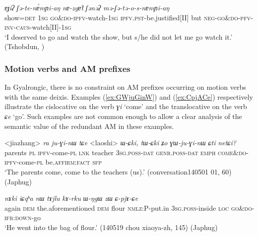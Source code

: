 \documentclass[oneside,a4paper,11pt]{article}
\newcommand{\ipa}[1]{{\phon\textit{#1}}}
\newcommand{\japhug}[2]{\textit{\phon#1} `#2'}
\newcommand{\sens}[1]{‘#1’}
\newcommand{\rouge}[1]{{\color{red}#1}}
\begin{document}
\begin{exe}
\ex \label{ex:mESEtosnAmYiaN}
\gll \ipa{tʃone=nəʔ}	\ipa{ɐɟiʔ}	\ipa{ʃə-te-nɐ́mɲi-aŋ}	\ipa{nɐ-zgɐ̂t}	\ipa{ʃənəʔ}	\ipa{mə-\rouge{ʃə}-tə-o-s-nɐmɲi-aŋ} \\
 show=\textsc{det} \textsc{1sg} \textsc{go\&do}-\textsc{ipfv}-watch-\textsc{1sg} \textsc{ipfv}.\textsc{pst}-be.justified[II] but \textsc{neg}-\rouge{\textsc{go\&do}}-\textsc{pfv}-\textsc{inv}-\textsc{caus}-watch[II]-\textsc{1sg} \\
\glt  \sens{I deserved to go and watch the show, but s/he did not let me go watch it.} (Tshobdun, \citealt[478]{sun12complementation})
  \end{exe} 
 

\subsubsection{Motion verbs and AM prefixes}
In Gyalrongic, there is no constraint on AM prefixes occurring on motion verbs with the same deixis. Examples (\ref{ex:GWjuGinW}) and (\ref{ex:CpjACe}) respectively illustrate the cislocative on the verb \japhug{ɣi}{come} and the translocative on the verb \japhug{ɕe}{go}. Such examples are not common enough to allow a clear analysis of the semantic value of the redundant AM in these examples.

\begin{exe}
\ex \label{ex:GWjuGinW}
 \gll <jiazhang> \ipa{ra}	\ipa{ju-ɣi-nɯ}	\ipa{tɕe}  <laoshi> \ipa{ɯ-ɕki,}	\ipa{tɯ-ɕki}	\ipa{ʑo}	\ipa{\rouge{ɣɯ}-ju-ɣi-nɯ}	\ipa{ɕti}	\ipa{netɕi?}  \\
 parents \textsc{pl} \textsc{ipfv}-come-\textsc{pl} \textsc{lnk} teacher \textsc{3sg}.\textsc{poss}-\textsc{dat} \textsc{genr}.\textsc{poss}-\textsc{dat} \textsc{emph} \rouge{\textsc{come\&do}}-\textsc{ipfv}-come-\textsc{pl} be.\textsc{affirm}:\textsc{fact} \textsc{sfp} \\
 \glt `The parents come, come to the teachers (us).' (conversation140501 01, 60) (Japhug)
\end{exe}

\begin{exe}
\ex \label{ex:CpjACe}
 \gll \ipa{li}	\ipa{nɤki}	\ipa{iɕqʰa}	\ipa{nɯ}	\ipa{tɤjlu}	\ipa{kɤ-rku}	\ipa{ɯ-ŋgɯ}	\ipa{zɯ}	\ipa{\rouge{ɕ}-pjɤ-ɕe} \\
 again \textsc{dem} the.aforementioned \textsc{dem} flour \textsc{nmlz}:P-put.in \textsc{3sg}.\textsc{poss}-inside \textsc{loc} \rouge{\textsc{go\&do}}-\textsc{ifr}:\textsc{down}-go \\
 \glt `He went into the bag of flour.' (140519 chou xiaoya-zh, 145) (Japhug)
\end{exe}
\end{document}
